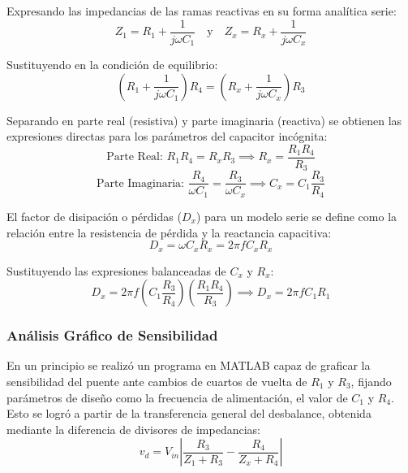 \documentclass{article}
\begin{document}
Expresando las impedancias de las ramas reactivas en su forma analítica serie:
\begin{equation}
    Z_1 = R_1 + \frac{1}{j\omega C_1} \quad \text{y} \quad Z_x = R_x + \frac{1}{j\omega C_x}
\end{equation}

Sustituyendo en la condición de equilibrio:
\begin{equation}
    \left( R_1 + \frac{1}{j\omega C_1} \right) R_4 = \left( R_x + \frac{1}{j\omega C_x} \right) R_3
\end{equation}

Separando en parte real (resistiva) y parte imaginaria (reactiva) se obtienen las expresiones directas para los parámetros del capacitor incógnita:
\begin{equation}
    \text{Parte Real: } R_1 R_4 = R_x R_3 \implies R_x = \frac{R_1 R_4}{R_3}
\end{equation}
\begin{equation}
    \text{Parte Imaginaria: } \frac{R_4}{\omega C_1} = \frac{R_3}{\omega C_x} \implies C_x = C_1 \frac{R_3}{R_4}
\end{equation}

El factor de disipación o pérdidas ($D_x$) para un modelo serie se define como la relación entre la resistencia de pérdida y la reactancia capacitiva:
\begin{equation}
    D_x = \omega C_x R_x = 2\pi f C_x R_x
\end{equation}

Sustituyendo las expresiones balanceadas de $C_x$ y $R_x$:
\begin{equation}
    D_x = 2\pi f \left( C_1 \frac{R_3}{R_4} \right) \left( \frac{R_1 R_4}{R_3} \right) \implies D_x = 2\pi f C_1 R_1
\end{equation}

\subsubsection{Análisis Gráfico de Sensibilidad}
En un principio se realizó un programa en MATLAB capaz de graficar la sensibilidad del puente ante cambios de cuartos de vuelta de $R_1$ y $R_3$, fijando parámetros de diseño como la frecuencia de alimentación, el valor de $C_1$ y $R_4$. 
Esto se logró a partir de la transferencia general del desbalance, obtenida mediante la diferencia de divisores de impedancias:
\begin{equation}
    v_d = V_{in} \left| \frac{R_3}{Z_1 + R_3} - \frac{R_4}{Z_x + R_4} \right|
\end{equation}
\end{document}
